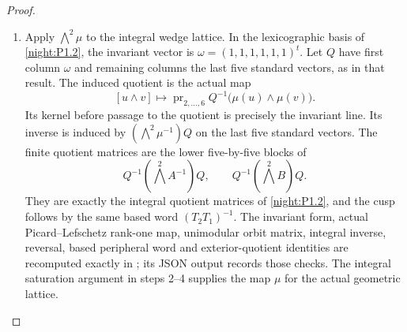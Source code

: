 \begin{proof}
\begin{enumerate}[label=\arabic*.]
\item Apply $\bigwedge^2\mu$ to the integral wedge lattice. In the
lexicographic basis of \cref{night:P1.2}, the invariant vector is
$\omega=(1,1,1,1,1,1)^t$. Let $Q$ have first column $\omega$ and
remaining columns the last five standard vectors, as in that result.
The induced quotient is the actual map
\[
 [u\wedge v]\longmapsto
 \operatorname{pr}_{2,\ldots,6}
 Q^{-1}\bigl(\mu(u)\wedge\mu(v)\bigr).
\]
Its kernel before passage to the quotient is precisely the invariant
line. Its inverse is induced by $(\bigwedge^2\mu^{-1})Q$ on the last
five standard vectors. The finite quotient matrices are the lower
five-by-five blocks of
\[
 Q^{-1}(\bigwedge^2 A^{-1})Q,\qquad
 Q^{-1}(\bigwedge^2 B)Q.
\]
They are exactly the integral quotient matrices of
\cref{night:P1.2}, and the cusp follows by the same based word
$(T_2T_1)^{-1}$. The invariant form, actual Picard--Lefschetz rank-one map,
unimodular orbit matrix, integral inverse, reversal, based peripheral
word and exterior-quotient identities are recomputed exactly in
; its JSON output records those checks.
The integral saturation argument in steps 2--4 supplies the map $\mu$
for the actual geometric lattice.
\end{enumerate}
\end{proof}
